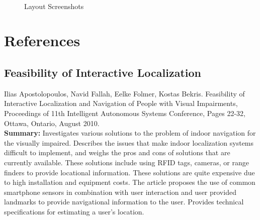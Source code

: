 \documentclass{scrreprt}
\begin{document}
\begin{figure}[ht!]
\begin{center}
{        }\\%
%
    \end{center}
    \caption{%
        Layout Screenshots
     }%
   \label{fig:subfigures}
\end{figure}
	
\chapter{References}

\section{Feasibility of Interactive Localization}
Ilias Apostolopoulos, Navid Fallah, Eelke Folmer, Kostas Bekris. Feasibility of Interactive Localization and Navigation of People with Visual Impairments, Proceedings of 11th Intelligent Autonomous Systems Conference, Pages 22-32, Ottawa, Ontario, August 2010.\\
 
 \textbf{Summary:}
Investigates various solutions to the problem of indoor navigation for the visually impaired. Describes the issues that make indoor localization systems difficult to implement, and weighs the pros and cons of solutions that are currently available. These solutions include using RFID tags, cameras, or range finders to provide locational information. These solutions are quite expensive due to high installation and equipment costs. The article proposes the use of common smartphone sensors in combination with user interaction and user provided landmarks to provide navigational information to the user. Provides technical specifications for estimating a user’s location.
 
\end{document}

